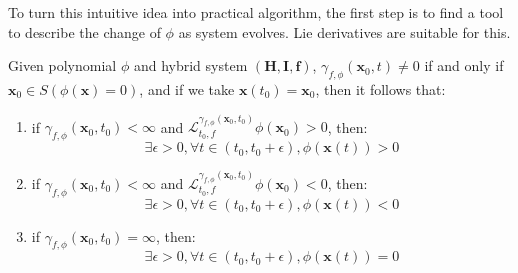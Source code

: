 \documentclass{article}
\begin{document}
To turn this intuitive idea into practical algorithm, the first step is to find a tool to describe the change of $\phi$ as system evolves. Lie derivatives are suitable for this.

\begin{Theorem}
\label{thm:lieDeri}
Given polynomial $\phi$ and hybrid system $(\boldsymbol{H}, \boldsymbol{I}, \boldsymbol{f})$, $\gamma_{f, \phi}(\boldsymbol{x}_0, t) \neq 0$ if and only if $\boldsymbol{x}_0 \in S(\phi(\boldsymbol{x}) = 0)$,  and if we take $\boldsymbol{x}(t_0) = \boldsymbol{x}_0$, then it follows that: 
\begin{enumerate}
	\item if $\gamma_{f, \phi}(\boldsymbol{x}_0, t_0) < \infty$ and $\mathcal{L}_{t_0, f}^{\gamma_{f, \phi}(\boldsymbol{x}_0, t_0)} \phi (\boldsymbol{x}_0) > 0$, then:
		\begin{equation*}
			\exists \epsilon > 0, \forall t \in (t_0, t_0 + \epsilon),\phi (\boldsymbol{x}(t)) > 0
		\end{equation*}
	\item if $\gamma_{f, \phi}(\boldsymbol{x}_0, t_0) < \infty$ and $\mathcal{L}_{t_0, f}^{\gamma_{f, \phi}(\boldsymbol{x}_0, t_0)} \phi (\boldsymbol{x}_0) < 0$, then:
		\begin{equation*}
			\exists \epsilon > 0, \forall t \in (t_0, t_0 + \epsilon),\phi (\boldsymbol{x}(t)) < 0
		\end{equation*}
	\item if $\gamma_{f, \phi}(\boldsymbol{x}_0, t_0) = \infty$, then:
		\begin{equation*}
			\exists \epsilon > 0, \forall t \in (t_0, t_0 + \epsilon),\phi (\boldsymbol{x}(t)) = 0
		\end{equation*}
\end{enumerate}
\end{Theorem}
\end{document}
